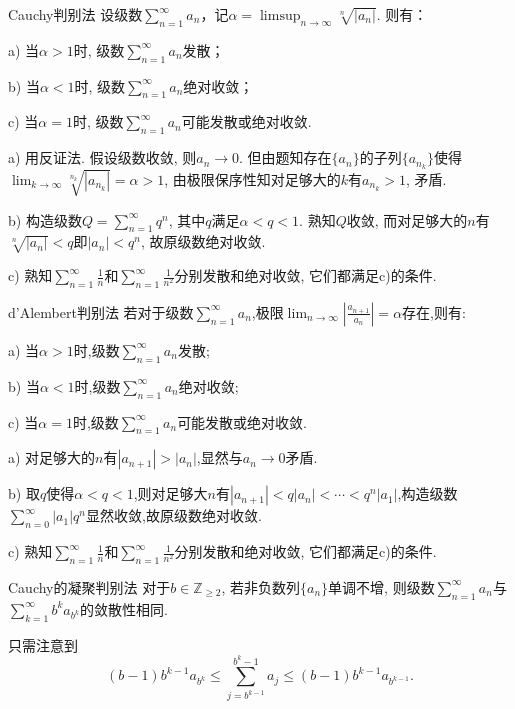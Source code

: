 \begin{exercise}{Cauchy判别法}
	设级数$\sum_{n=1}^{\infty} a_n$，记$\alpha = \limsup_{n\to \infty} \sqrt[n]{|a_n|}$. 则有：
	
	a) 当$\alpha >1$时, 级数$\sum_{n=1}^{\infty} a_n$发散；
	
	b) 当$\alpha <1$时, 级数$\sum_{n=1}^{\infty} a_n$绝对收敛；
	
	c) 当$\alpha =1$时, 级数$\sum_{n=1}^{\infty} a_n$可能发散或绝对收敛.
\end{exercise}
\begin{solution}
	a) 用反证法. 假设级数收敛, 则$a_n \to 0$. 但由题知存在$\{ a_n \}$的子列$\{ a_{n_k} \}$使得$\lim_{k\to \infty} \sqrt[n_k]{|a_{n_k}|} = \alpha > 1$, 由极限保序性知对足够大的$k$有$a_{n_k}>1$, 矛盾.
	
	b) 构造级数$Q=\sum_{n=1}^{\infty} q^n$, 其中$q$满足$\alpha < q <1$. 熟知$Q$收敛, 而对足够大的$n$有$\sqrt[n]{|a_n|}<q$即$|a_n|<q^n$, 故原级数绝对收敛. 
	
	c) 熟知$\sum_{n=1}^{\infty} \frac{1}{n}$和$\sum_{n=1}^{\infty} \frac{1}{n^2}$分别发散和绝对收敛, 它们都满足c)的条件.
\end{solution}

\begin{exercise}{d’Alembert判别法}
	若对于级数$\sum_{n=1}^{\infty} a_n$,极限$\lim_{n\to \infty}|\frac{a_{n+1}}{a_n} |=\alpha$存在,则有:
	
	a) 当$\alpha >1$时,级数$\sum_{n=1}^{\infty} a_n$发散;
	
	b) 当$\alpha <1$时,级数$\sum_{n=1}^{\infty} a_n$绝对收敛;
	
	c) 当$\alpha =1$时,级数$\sum_{n=1}^{\infty} a_n$可能发散或绝对收敛.
\end{exercise}
\begin{solution}
	a) 对足够大的$n$有$|a_{n+1}|>|a_n|$,显然与$a_n\to 0$矛盾.
	
	b) 取$q$使得$\alpha < q <1$,则对足够大$n$有$|a_{n+1}|<q|a_n|<\cdots < q^n|a_1|$,构造级数$\sum_{n=0}^{\infty} |a_1|q^n$显然收敛,故原级数绝对收敛.
	
	c) 熟知$\sum_{n=1}^{\infty} \frac{1}{n}$和$\sum_{n=1}^{\infty} \frac{1}{n^2}$分别发散和绝对收敛, 它们都满足c)的条件.
\end{solution}

\begin{exercise}{Cauchy的凝聚判别法}
	对于$b \in \mathbb{Z}_{\geq 2}$, 若非负数列$\{ a_n \}$单调不增, 则级数$\sum_{n=1}^{\infty} a_n$与$\sum_{k=1}^{\infty} b^k a_{b^k}$的敛散性相同. 
\end{exercise}
\begin{solution}
	只需注意到$$(b-1)b^{k-1}a_{b^k} \leq \sum_{j=b^{k-1}}^{b^k-1} a_j \leq (b-1)b^{k-1}a_{b^{k-1}}.$$
\end{solution}

